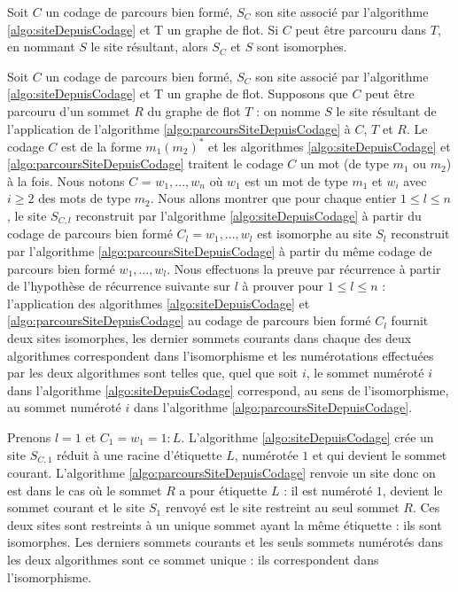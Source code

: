 \begin{prop}
 Soit $C$ un codage de parcours bien formé, $S_C$ son site associé par l'algorithme \ref{algo:siteDepuisCodage} et T un graphe de flot. Si $C$ peut être parcouru dans $T$, en nommant $S$ le site résultant, alors $S_C$ et $S$ sont isomorphes.
 \label{prop:condageDoncIso}
\end{prop}

\begin{pr}
Soit $C$ un codage de parcours bien formé, $S_C$ son site associé par l'algorithme \ref{algo:siteDepuisCodage} et T un graphe de flot. Supposons que $C$ peut être parcouru d'un sommet $R$ du graphe de flot $T$ : on nomme $S$ le site résultant de l'application de l'algorithme \ref{algo:parcoursSiteDepuisCodage} à $C$, $T$ et $R$.
Le codage $C$ est de la forme $m_1(m_2)^*$ 
et les algorithmes \ref{algo:siteDepuisCodage} et \ref{algo:parcoursSiteDepuisCodage} traitent le codage $C$ un mot (de type $m_1$ ou $m_2$) à la fois.
Nous notons $C$ = $w_1, ..., w_n$ où $w_1$ est un mot de type $m_1$ et $w_i$ avec $i\geq 2$ des mots de type $m_2$.
Nous allons montrer que pour chaque entier $1\leq l\leq n$, le site $S_{C,l}$ reconstruit par l'algorithme \ref{algo:siteDepuisCodage} à partir du codage de parcours bien formé $C_l=w_1, ..., w_l$ est isomorphe au site $S_l$ reconstruit par l'algorithme \ref{algo:parcoursSiteDepuisCodage} à partir du même codage de parcours bien formé $w_1, ..., w_l$.
Nous effectuons la preuve par récurrence à partir de l'hypothèse de récurrence suivante sur $l$ à prouver pour $1\leq l\leq n$ : l'application des algorithmes \ref{algo:siteDepuisCodage} et \ref{algo:parcoursSiteDepuisCodage} au codage de parcours bien formé $C_l$ fournit deux sites isomorphes, les dernier sommets courants dans chaque des deux algorithmes correspondent dans l'isomorphisme et les numérotations effectuées par les deux algorithmes sont telles que, quel que soit $i$, le sommet numéroté $i$ dans l'algorithme \ref{algo:siteDepuisCodage} correspond, au sens de l'isomorphisme, au sommet numéroté $i$ dans l'algorithme \ref{algo:parcoursSiteDepuisCodage}.

Prenons $l=1$ et $C_1=w_1=1:L$. L'algorithme \ref{algo:siteDepuisCodage} crée un site $S_{C,1}$ réduit à une racine d'étiquette $L$, numérotée $1$ et qui devient le sommet courant. L'algorithme \ref{algo:parcoursSiteDepuisCodage} renvoie un site donc on est dans le cas où le sommet $R$ a pour étiquette $L$ : il est numéroté $1$, devient le sommet courant et le site $S_1$ renvoyé est le site restreint au seul sommet $R$. Ces deux sites sont restreints à un unique sommet ayant la même étiquette : ils sont isomorphes. Les derniers sommets courants et les seuls sommets numérotés dans les deux algorithmes sont ce sommet unique : ils correspondent dans l'isomorphisme.


\end{pr}
